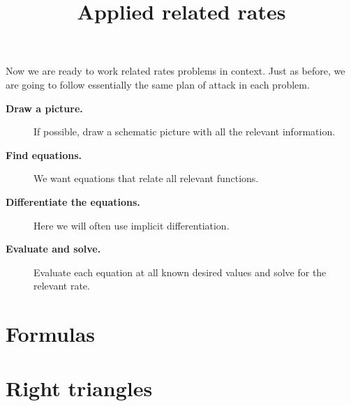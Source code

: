 \documentclass{ximera}
\title[Dig-In:]{Applied related rates}
\begin{document}
\begin{abstract}
\end{abstract}
\maketitle

Now we are ready to work related rates problems in context. Just as
before, we are going to follow essentially the same plan of attack in
each problem.


\begin{description}
\item[\textbf{Draw a picture.}] If possible, draw a schematic picture with all the relevant information. 
\item[\textbf{Find equations.}] We want equations that relate all
  relevant functions.
\item[\textbf{Differentiate the equations.}] Here we will often use
  implicit differentiation.
\item[\textbf{Evaluate and solve.}] Evaluate
  each equation at all known desired values and solve for the relevant
  rate.
\end{description}



\section{Formulas}



\section{Right triangles}
\end{document}
